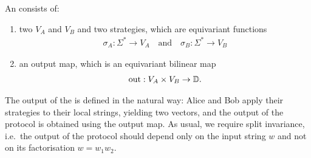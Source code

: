 \begin{definition}
    \label{def:orbit-finite-scalar-product-protocol}
    \AP
    An  consists of:
    \begin{enumerate}
      \item two 
        $V_A$ and $V_B$ and two strategies, which are equivariant functions
        \begin{align*}
        \sigma_A : \Sigma^* \to V_A 
        \quad \text{and} \quad
        \sigma_B : \Sigma^* \to V_B
        \end{align*}
        \item an output map, which is an equivariant bilinear map 
        \begin{align*}
        \text{out} : V_A \times V_B \to \mathbb D.
        \end{align*}
    \end{enumerate}
\end{definition}
The output of the  is defined in the natural way: 
Alice and Bob apply their strategies to their local strings, yielding two vectors, 
and the output of the protocol is obtained using the output map. 
As usual, we require split invariance, i.e.~the output of the protocol should
depend only on the input string $w$ and not on its factorisation $w = w_1 w_2$.


